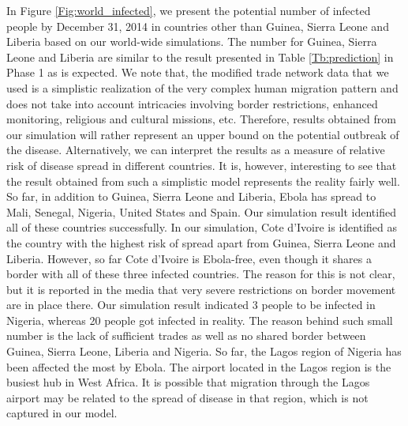 \documentclass[10pt, journal,onecolumn]{IEEEtran}
\begin{document}
In Figure \ref{Fig:world_infected}, we present the potential number of infected people by December
31, 2014 in countries other than Guinea, Sierra Leone and Liberia based on our world-wide
simulations. The number for Guinea, Sierra Leone and Liberia are similar to the result presented in
Table \ref{Tb:prediction} in Phase 1 as is expected. We note that, the modified trade network data
that we used is a simplistic realization of the very complex human migration pattern and does not
take into account intricacies involving border restrictions, enhanced monitoring, religious and
cultural missions, etc. Therefore, results obtained from our simulation  will rather represent  an
upper bound on the potential outbreak of the disease. Alternatively, we can interpret the results as
a measure of relative risk of disease spread in different countries. It is, however, interesting to
see that the result obtained from such a simplistic model represents the reality fairly well. So far,
in addition to  Guinea, Sierra Leone and Liberia, Ebola has spread to Mali, Senegal, Nigeria, United
States and Spain. Our simulation result identified all of these countries successfully. In our
simulation, Cote d'Ivoire is identified as the country with the highest risk of spread apart from
Guinea, Sierra Leone and Liberia. However, so far Cote d'Ivoire is Ebola-free, even though it shares a
border with all of these three infected countries. The reason for this is not clear, but it is reported
in the media that very severe restrictions on border movement are in place there.
Our simulation result indicated 3 people to be infected in Nigeria, whereas
20 people got infected in reality. The reason behind such small number is the lack of sufficient
trades as well as no shared border between Guinea, Sierra Leone, Liberia and Nigeria. So far, the Lagos
region of Nigeria has been affected the most by Ebola. The airport located in the Lagos region is
the busiest hub in West Africa. It is possible that migration through the Lagos airport may be related
to the spread of disease in that region, which is not captured in our model.
\end{document}
